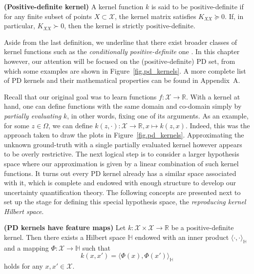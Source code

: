 \begin{definition}
	\label{def.pd_kernel}
	\textbf{(Positive-definite kernel)} A kernel function $k$ is said to be positive-definite if for any finite subset of points $X \subset \mathcal{X}$, the kernel matrix satisfies $K_{XX} \succeq 0$. If, in particular, $K_{XX} \succ 0$, then the kernel is strictly positive-definite.
\end{definition}

Aside from the last definition, we underline that there exist broader classes of kernel functions such as the \textit{conditionally positive-definite} one \cite[§2.4]{scholkopf2002learning}\cite[§8]{wendland2004scattered}. In this chapter however, our attention will be focused on the (positive-definite) PD set, from which some examples are shown in Figure~\ref{fig.pd_kernels}. A more complete list of PD kernels and their mathematical properties can be found in Appendix~A.

Recall that our original goal was to learn functions $f: \mathcal{X} \rightarrow \mathbb{R}$. With a kernel at hand, one can define functions with the same domain and co-domain simply by \textit{partially evaluating} $k$, in other words, fixing one of its arguments. As an example, for some $z \in \Omega$, we can define $k(z,\cdot): \mathcal{X} \rightarrow \mathbb{R}, x \mapsto k(z,x)$. Indeed, this was the approach taken to draw the plots in Figure~\ref{fig.pd_kernels}. Approximating the unknown ground-truth with a single partially evaluated kernel however appears to be overly restrictive. The next logical step is to consider a larger hypothesis space where our approximation is given by a linear combination of such kernel functions. It turns out every PD kernel already has a similar space associated with it, which is complete and endowed with enough structure to develop our uncertainty quantification theory. The following concepts are presented next to set up the stage for defining this special hypothesis space, the \textit{reproducing kernel Hilbert space}.

\begin{proposition}
	\label{thm.pd_kernels_feature_maps}
	\textbf{(PD kernels have feature maps)} 
	Let $k:\mathcal{X} \times \mathcal{X} \rightarrow \mathbb{R} $ be a positive-definite kernel. Then there exists a Hilbert space $\mathbb{H}$ endowed with an inner product $\langle \cdot,\cdot \rangle_\mathbb{H}$ and a mapping $\Phi :  \mathcal{X} \rightarrow \mathbb{H}$ such that 
	\begin{equation}
		k(x,x') = \langle \Phi(x),\Phi(x') \rangle_\mathbb{H}
	\end{equation}
	holds for any $x,x' \in \mathcal{X}$.
\end{proposition}

